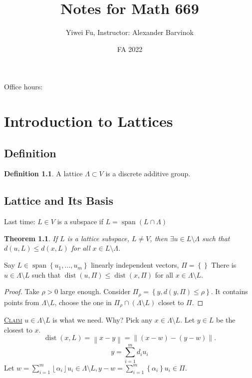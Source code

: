 \documentclass{report}
\def \dist {\operatorname{dist}}
\def \dist {\operatorname{dist}}
\newcommand{\norm}[1]{\left\| #1 \right\|}
\newcommand{\floor}[1]{\left\lfloor #1 \right\rfloor}
\newcommand{\set}[1]{\left\{ #1 \right\}}
\newcommand{\fancyem}[1]{\underline{\textsc{#1}}}
\newtheorem{theorem}{Theorem}[section]
\theoremstyle{definition}
\newtheorem{definition}{Definition}[section]
\theoremstyle{remark}
\numberwithin{equation}{section}
\begin{document}
\title{Notes for Math 669}
\author{Yiwei Fu, Instructor: Alexander Barvinok}
\date{FA 2022}
\maketitle


\tableofcontents
Office hours: 

\clearpage
{}


\chapter{Introduction to Lattices}
\section{Definition}
\begin{definition}
    A lattice $\Lambda \subset V$ is a discrete additive group.
\end{definition}

\section{Lattice and Its Basis}
Last time: $L \in V$ is a subspace if $L = \operatorname{span} (L \cap \Lambda)$

\begin{theorem}
    If $L$ is a lattice subspace, $L \neq V$, then $\exists u \in L \setminus \Lambda$ such that $d(u, L) \leq d(x, L)$ for all $x \in L \setminus \Lambda$.
\end{theorem}

Say $L \in \operatorname{span}\left\{u_1, \ldots, u_m\right\}$ linearly independent vectors, $\Pi = \left\{\right\}$ There is $u \in \Lambda \setminus L$ such that $\dist(u, \Pi) \leq \dist(x, \Pi)$ for all $x \in \Lambda \setminus L$. 
\begin{proof}
    Take $\rho > 0$ large enough. Consider $\Pi_\rho = \left\{y, d(y, \Pi) \leq \rho\right\}$. It contains points from $\Lambda \setminus L$, choose the one in $\Pi_\rho \cap (\Lambda \setminus L)$ closet to $\Pi$.
\end{proof}
\fancyem{Claim} $u \in \Lambda \setminus L$ is what we need. Why?
Pick any $x \in \Lambda \setminus L$. Let $y \in L$ be the closest to $x$. 
\[\dist(x, L) = \norm{x - y} = \norm{(x - w) - (y - w)}.\]
\[y = \sum_{i=1}^m d_iu_i\]
Let $w = \sum_{i=1}^m \floor{\alpha_i}u_i \in \Lambda \setminus L, y - w = \sum_{i=1}^m \set{\alpha_i}u_i \in \Pi$. 
\end{document}
